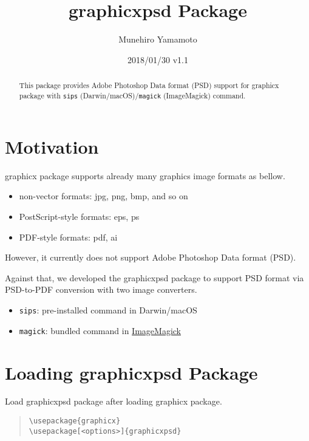 \documentclass[luatex]{article}
\title{\textsf{graphicxpsd} Package}
\author{Munehiro Yamamoto}
\date{2018/01/30 v1.1}
\begin{document}
\maketitle
\begin{abstract}
This package provides Adobe Photoshop Data format (PSD) support
for \textsf{graphicx} package
with \texttt{sips} (Darwin/macOS)/\texttt{magick} (ImageMagick) command.
\end{abstract}

\section{Motivation}
\textsf{graphicx} package supports already many graphics image formats as bellow.
\begin{itemize}
\item non-vector formats: jpg, png, bmp, and so on
\item PostScript-style formats: eps, ps
\item PDF-style formats: pdf, ai
\end{itemize}
However, it currently does not support Adobe Photoshop Data format (PSD).

Against that, we developed the \textsf{graphicxpsd} package
to support PSD format via PSD-to-PDF conversion
with two image converters.
\begin{itemize}
\item \texttt{sips}:
pre-installed command in Darwin/macOS

\item \texttt{magick}:
bundled command in \href{https://www.imagemagick.org/}{ImageMagick}
\end{itemize}

\section{Loading \textsf{graphicxpsd} Package}

Load \textsf{graphicxpsd} package after loading \textsf{graphicx} package.

\begin{quote}
\begin{verbatim}
\usepackage{graphicx}
\usepackage[<options>]{graphicxpsd}
\end{verbatim}
\end{quote}
\end{document}
